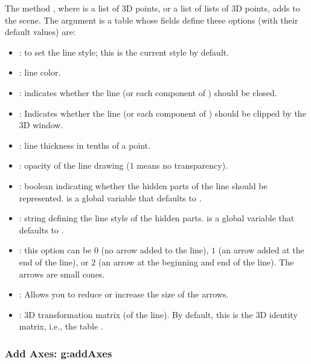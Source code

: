 The method , where  is a list of 3D points, or a list of lists of 3D points, adds  to the scene. The  argument is a table whose fields define these options (with their default values) are:
\begin{itemize}
    \item {}: to set the line style; this is the current style by default.
    \item {}: line color.

    \item {}: indicates whether the line  (or each component of ) should be closed.
     \item {}: Indicates whether the line  (or each component of ) should be clipped by the 3D window.

    \item {}: line thickness in tenths of a point.

    \item {}: opacity of the line drawing ($1$ means no transparency).

    \item {}: boolean indicating whether the hidden parts of the line should be represented.  is a global variable that defaults to \false.

    \item {}: string defining the line style of the hidden parts.  is a global variable that defaults to .

     \item {}: this option can be $0$ (no arrow added to the line), $1$ (an arrow added at the end of the line), or $2$ (an arrow at the beginning and end of the line). The arrows are small cones.

    \item {}: Allows you to reduce or increase the size of the arrows.

    \item {}: 3D transformation matrix (of the line). By default, this is the 3D identity matrix, i.e., the table .
\end{itemize}

\subsubsection{Add Axes: g:addAxes}

